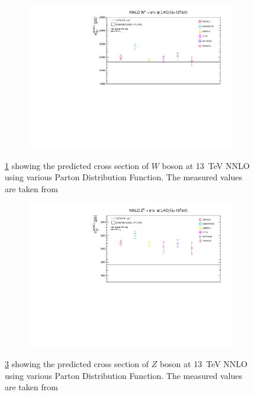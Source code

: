 \begin{figure}[H]
\centering
\begin{subfigure}{\textwidth}
\includegraphics[scale=0.7]{chapter4/WCS.pdf}
\vspace*{-4mm}
\caption{}
\label{WCSNNLO}
\end{subfigure}
\caption{\ref{WCSNNLO} showing the predicted cross section of $W$ boson at 13~TeV NNLO using various Parton Distribution Function. The measured values are taken from~\cite{Aad_2016}}
\label{WCSNNLO1}
\end{figure}

\begin{figure}[H]
\centering
\begin{subfigure}{\textwidth}
\includegraphics[scale=0.7]{chapter4/ZCS.pdf}
\vspace*{-6mm}
\caption{}
\label{ZCSNNLO}
\end{subfigure}
\caption{\ref{ZCSNNLO} showing the predicted cross section of $Z$ boson at 13~TeV NNLO using various Parton Distribution Function. The measured values are taken from~\cite{Aad_2016} }
\label{WZCS}
\end{figure}

